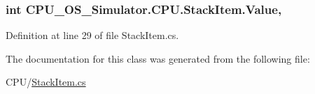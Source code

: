 \subsubsection[{Value}]{\setlength{\rightskip}{0pt plus 5cm}int C\+P\+U\+\_\+\+O\+S\+\_\+\+Simulator.\+C\+P\+U.\+Stack\+Item.\+Value\hspace{0.3cm}{\ttfamily [get]}, {\ttfamily [set]}}\label{class_c_p_u___o_s___simulator_1_1_c_p_u_1_1_stack_item_ac8e518e9111640d56d59efbff2fa3161}


Definition at line 29 of file Stack\+Item.\+cs.



The documentation for this class was generated from the following file\+:\begin{DoxyCompactItemize}
\item 
C\+P\+U/\hyperlink{_stack_item_8cs}{Stack\+Item.\+cs}\end{DoxyCompactItemize}

